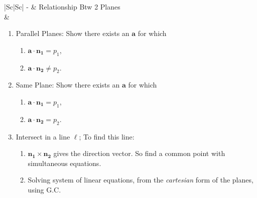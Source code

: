 \documentclass[oneside]{book}
\begin{document}
\begin{longtable}{|Sc|Sc|}
\hline
- & Relationship Btw 2 Planes\\
\hline &
\begin{minipage}{0.5\textwidth}
  \begin{enumerate}
    \item Parallel Planes: Show there exists an \(\mathbf{a}\) for which
    \begin{enumerate}
      \item \(\mathbf{a}\cdot \mathbf{n_1}= p_1\),
      \item \(\mathbf{a}\cdot \mathbf{n_2}\neq p_2\).
    \end{enumerate}
    \item Same Plane: Show there exists an \(\mathbf{a}\) for which
    \begin{enumerate}
      \item \(\mathbf{a}\cdot \mathbf{n_1}= p_1\),
      \item \(\mathbf{a}\cdot \mathbf{n_2}= p_2\).
    \end{enumerate}
    \item Intersect in a line \(\ell\); To find this line:
    \begin{enumerate}[label=M\arabic*:]
      \item \(\mathbf{n_1}\times \mathbf{n_2}\) gives the direction vector. So find a common point with simultaneous equations.
      \item Solving system of linear equations, from the \emph{cartesian} form of the planes, using G.C.
    \end{enumerate}
  \end{enumerate}
\end{minipage}\\
\hline
{}\\
\hline
{}\\
  \hline
\end{longtable}
\end{document}
